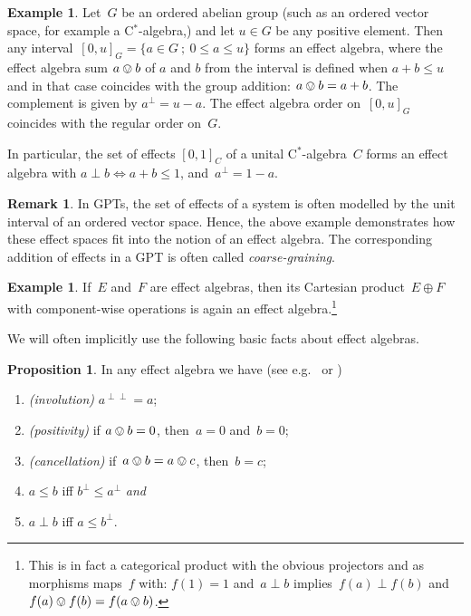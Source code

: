 \documentclass[a4paper, onecolumn, accepted=2020-12-22]{quantumarticle}
\newcounter{counter}
\theoremstyle{definition}
\newtheorem{proposition}[counter]{Proposition}
\newtheorem{example}[counter]{Example}
\newtheorem{remark}[counter]{Remark}
\begin{document}
\begin{example}\label{ex:cstaralgebra}
Let~$G$ be an ordered abelian group
    (such as an ordered vector space, for example a C$^*$-algebra,)
    and let $u\in G$ be any positive element.
    Then any interval~$[0,u]_G =
    \{a\in G~;~ 0\leq a \leq u\}$ forms an effect algebra, 
    where the effect algebra sum $a\ovee b$ of $a$ and $b$ 
    from the interval is defined when $a+b \leq u$ and 
    in that case coincides
    with the group addition: $a\ovee b = a+b$.
    The complement is
    given by $a^\perp = u-a$.
    The effect algebra order on~$[0,u]_G$ coincides
    with the regular
    order on~$G$.  
    
    In particular,
    the set of effects $[0,1]_C$
    of a unital C$^*$-algebra~$C$ forms an effect algebra
    with $a\perp b\iff a+b\leq 1$,
    and~$a^\perp = 1-a$.
\end{example}

\begin{remark}
In GPTs, the set of effects of a system is often modelled by the unit interval of an ordered vector space. Hence, the above example demonstrates how these effect spaces fit into the notion of an effect algebra. The corresponding addition of effects in a GPT is often called \emph{coarse-graining}.
\end{remark}

\begin{example}\label{eaprod}
If~$E$ and~$F$ are effect algebras, then
    its Cartesian product~$E \oplus F$
    with component-wise operations
    is again an effect algebra.\footnote{This is in fact 
    a categorical product
        with the obvious projectors and as morphisms
        maps~$f$ with: $f(1)=1$ and~$a \perp b$ implies~$f(a) \perp f(b)$
        and~$f(a)\ovee f(b) = f(a\ovee b)$.}
\end{example}

We will often implicitly use the following basic facts about effect algebras.
\begin{proposition}
    In any effect algebra we have (see e.g.~\cite{dvurecenskij2013new} or
        \cite[\S175V]{basthesis})
    \begin{enumerate}
        \item \emph{(involution)} $a^{\perp\perp} = a$;
        \item \emph{(positivity)} if $a\ovee b = 0$, then~$a=0$ and~$b=0$;
        \item \emph{(cancellation)} if~$a \ovee b = a \ovee c$, then~$b = c$;
        \item $a \leq b$ iff $b^\perp \leq a^\perp$ \emph{and}
        \item $a \perp b$ iff $a \leq b^\perp$.
    \end{enumerate}
\end{proposition}
\end{document}
